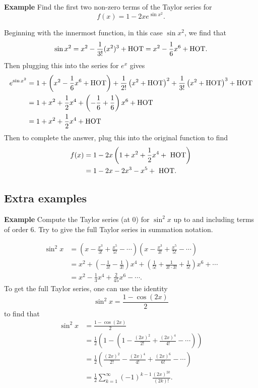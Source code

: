 \documentclass[twoside,openright,titlepage,a4paper]{book}
\begin{document}
\begin{sloppypar}
\textbf{Example} Find the first two non-zero terms of the Taylor series for \[f(x)=1-2xe^{\sin x^2}.\]
\begin{examplebox}
Beginning with the innermost function, in this case ${\sin x^2}$, we find that \[\sin x^2=x^2-\frac{1}{3!}(x^2)^3+\hbox{HOT}=x^2-\frac{1}{6}x^6+\hbox{HOT}.\]
Then plugging this into the series for $e^x$ gives
\begin{align*}
e^{\sin x^2}&=1+\left(x^2-\frac{1}{6}x^6+\hbox{HOT}\right)+\frac{1}{2!}\left(x^2+\hbox{HOT}\right)^2+\frac{1}{3!}\left(x^2+\hbox{HOT}\right)^3+\hbox{HOT} \\
&=1+x^2+\frac{1}{2}x^4+\left(-\frac{1}{6}+\frac{1}{6}\right)x^6+\hbox{HOT} \\
&=1+x^2+\frac{1}{2}x^4+\hbox{HOT}
\end{align*}
Then to complete the answer, plug this into the original function to find
\begin{align*}
f(x) &= 1 - 2x \left( 1 + x^2 + \frac{1}{2}x^4 + \hbox{ HOT}\right) \\
&= 1 - 2x - 2x^3 - x^5 + \hbox{ HOT}.
\end{align*}
\end{examplebox}

\subsection{Extra examples}

\textbf{Example} Compute the Taylor series (at 0) for ${\sin^2 x}$ up to and including terms of order 6. Try to give the full Taylor series in summation notation.
\begin{examplebox}
\begin{align*}
\sin^2 x &= (x-\frac{x^3}{3!}+\frac{x^5}{5!}-\dotsb)(x-\frac{x^3}{3!}+\frac{x^5}{5!}-\dotsb) \\
&=x^2+(-\frac{1}{3!}-\frac{1}{3!})x^4+(\frac{1}{5!}+\frac{1}{3!\cdot 3!}+\frac{1}{5!})x^6+\dotsb \\
&= x^2-\frac{1}{3}x^4+\frac{2}{45}x^6-\dotsb.
\end{align*}
To get the full Taylor series, one can use the identity \[\sin^2 x=\frac{1-\cos(2x)}{2}\] to find that
\begin{align*}
\sin^2 x &= \frac{1-\cos(2x)}{2} \\
&=\frac{1}{2}\left(1-\left(1-\frac{(2x)^2}{2!}+\frac{(2x)^4}{4!}-\dotsb\right)\right) \\
&=\frac{1}{2}\left(\frac{(2x)^2}{2!}-\frac{(2x)^4}{4!}+\frac{(2x)^6}{6!}-\dotsb\right) \\
&=\frac{1}{2}\sum_{k=1}^\infty(-1)^{k-1}\frac{(2x)^{2k}}{(2k)!}.
\end{align*}
\end{examplebox}
	

\end{sloppypar}
\end{document}
